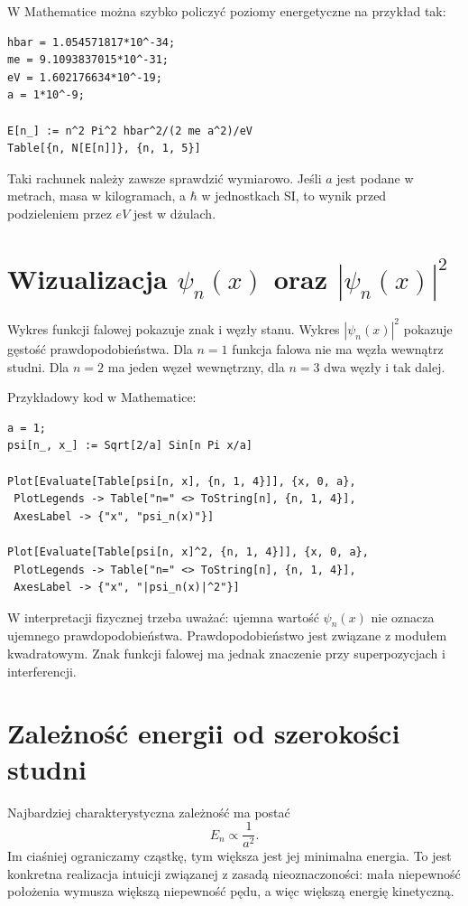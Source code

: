 W Mathematice można szybko policzyć poziomy energetyczne na przykład tak:
\begin{verbatim}
hbar = 1.054571817*10^-34;
me = 9.1093837015*10^-31;
eV = 1.602176634*10^-19;
a = 1*10^-9;

E[n_] := n^2 Pi^2 hbar^2/(2 me a^2)/eV
Table[{n, N[E[n]]}, {n, 1, 5}]
\end{verbatim}

Taki rachunek należy zawsze sprawdzić wymiarowo. Jeśli \(a\) jest podane w metrach, masa w kilogramach, a \(\hbar\) w jednostkach SI, to wynik przed podzieleniem przez \(eV\) jest w dżulach.

\section{Wizualizacja \texorpdfstring{\(\psi_n(x)\)}{psi_n(x)} oraz \texorpdfstring{\(|\psi_n(x)|^2\)}{|psi_n(x)|^2}}

Wykres funkcji falowej pokazuje znak i węzły stanu. Wykres \(|\psi_n(x)|^2\) pokazuje gęstość prawdopodobieństwa. Dla \(n=1\) funkcja falowa nie ma węzła wewnątrz studni. Dla \(n=2\) ma jeden węzeł wewnętrzny, dla \(n=3\) dwa węzły i tak dalej.

Przykładowy kod w Mathematice:
\begin{verbatim}
a = 1;
psi[n_, x_] := Sqrt[2/a] Sin[n Pi x/a]

Plot[Evaluate[Table[psi[n, x], {n, 1, 4}]], {x, 0, a},
 PlotLegends -> Table["n=" <> ToString[n], {n, 1, 4}],
 AxesLabel -> {"x", "psi_n(x)"}]

Plot[Evaluate[Table[psi[n, x]^2, {n, 1, 4}]], {x, 0, a},
 PlotLegends -> Table["n=" <> ToString[n], {n, 1, 4}],
 AxesLabel -> {"x", "|psi_n(x)|^2"}]
\end{verbatim}

W interpretacji fizycznej trzeba uważać: ujemna wartość \(\psi_n(x)\) nie oznacza ujemnego prawdopodobieństwa. Prawdopodobieństwo jest związane z modułem kwadratowym. Znak funkcji falowej ma jednak znaczenie przy superpozycjach i interferencji.

\section{Zależność energii od szerokości studni}

Najbardziej charakterystyczna zależność ma postać
\begin{equation}
E_n\propto \frac{1}{a^2}.
\end{equation}
Im ciaśniej ograniczamy cząstkę, tym większa jest jej minimalna energia. To jest konkretna realizacja intuicji związanej z zasadą nieoznaczoności: mała niepewność położenia wymusza większą niepewność pędu, a więc większą energię kinetyczną.

